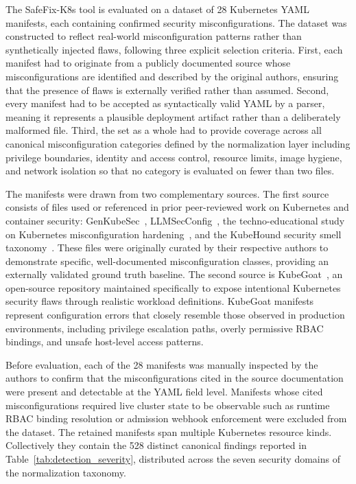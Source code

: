 \documentclass[preprint,12pt]{elsarticle}
\newcommand{\new}[1]{#1}
\begin{document}
\new{The SafeFix-K8s tool is evaluated on a dataset of 28 Kubernetes YAML 
manifests, each containing confirmed security misconfigurations. The dataset 
was constructed to reflect real-world misconfiguration patterns rather than 
synthetically injected flaws, following three explicit selection criteria. 
First, each manifest had to originate from a publicly documented source 
whose misconfigurations are identified and described by the original authors, 
ensuring that the presence of flaws is externally verified rather than 
assumed. Second, every manifest had to be accepted as syntactically valid 
YAML by a parser, meaning it represents a plausible deployment artifact 
rather than a deliberately malformed file. Third, the set as a whole had to 
provide coverage across all canonical misconfiguration categories defined by 
the normalization layer including privilege boundaries, identity and 
access control, resource limits, image hygiene, and network isolation so 
that no category is evaluated on fewer than two files.}

\new{The manifests were drawn from two complementary sources. The first 
source consists of files used or referenced in prior peer-reviewed work on 
Kubernetes and container security: GenKubeSec~\cite{malul2024genkubesec}, 
LLMSecConfig~\cite{ye2025llmsecconfig}, the techno-educational study on 
Kubernetes misconfiguration hardening~\cite{shamim2024technoeducational}, 
and the KubeHound security smell taxonomy~\cite{dellimmagine2023kubehound}. 
These files were originally curated by their respective authors to 
demonstrate specific, well-documented misconfiguration classes, providing 
an externally validated ground truth baseline. The second source is 
KubeGoat~\cite{madhuakula_kubernetes_goat}, an open-source repository 
maintained specifically to expose intentional Kubernetes security flaws 
through realistic workload definitions. KubeGoat manifests represent 
configuration errors that closely resemble those observed in production 
environments, including privilege escalation paths, overly permissive 
RBAC bindings, and unsafe host-level access patterns.}


\new{Before evaluation, each of the 28 manifests was manually inspected by 
the authors to confirm that the misconfigurations cited in the source 
documentation were present and detectable at the YAML field level. Manifests 
whose cited misconfigurations required live cluster state to be observable 
such as runtime RBAC binding resolution or admission webhook enforcement 
were excluded from the dataset. The retained manifests span multiple 
Kubernetes resource kinds. Collectively they contain the 528 distinct canonical findings reported in Table~\ref{tab:detection_severity}, distributed across the seven security domains of the normalization taxonomy. }
\end{document}
